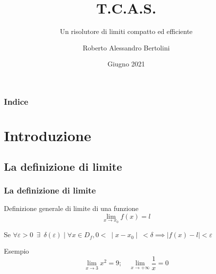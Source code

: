 \documentclass{beamer}
\title{T.C.A.S.}
\author[Roberto Bertolini]{Roberto Alessandro Bertolini}
\institute[Liceo Nervi Ferrari]{Liceo "P. Nervi - G. Ferrari" - Morbegno}
\date{Giugno 2021}
\subtitle{Un risolutore di limiti compatto ed efficiente}
\begin{document}
	
	\begin{frame}
		\titlepage
	\end{frame}
	
	\begin{frame}
		\frametitle{Indice}
		\tableofcontents
	\end{frame}
	
	\section{Introduzione}
	
	\subsection{La definizione di limite}
	\begin{frame}
		\frametitle{La definizione di limite}
		\begin{block}{Definizione generale di limite di una funzione}
			\[ 
			\lim_{x \to x_{0}}{f(x) = l} 
			\]
			
			Se \( 
			\forall \varepsilon > 0 \enspace \exists \enspace \delta(\varepsilon) \mid \forall x \in D_{f}, 0 < \: \mid x - x_{0} \mid \: <\delta \implies \mid f(x) - l \mid < \varepsilon
			\)
		\end{block}
		\begin{exampleblock}{Esempio}
			\[
				\lim_{x \to 3}{x^2} = 9; \quad \lim_{x \to +\infty}{\frac{1}{x}} = 0
			\]
		\end{exampleblock}
	\end{frame}
	
\end{document}
